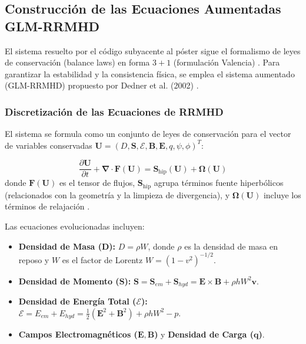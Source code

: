 \subsection{Construcción de las Ecuaciones Aumentadas GLM-RRMHD}

El sistema resuelto por el código subyacente al póster sigue el formalismo de leyes de conservación (balance laws) en forma $3+1$ (formulación Valencia) \cite{180, 182, 365, 417}. Para garantizar la estabilidad y la consistencia física, se emplea el sistema aumentado (GLM-RRMHD) propuesto por Dedner et al. (2002) \cite{356, 367, 420, 426, 431, 461, 462, 497}.

\subsubsection{Discretización de las Ecuaciones de RRMHD}

El sistema se formula como un conjunto de leyes de conservación para el vector de variables conservadas $\mathbf{U} = (D, \mathbf{S}, \mathcal{E}, \mathbf{B}, \mathbf{E}, q, \psi, \phi)^T$:

\begin{equation}
\label{eq:RRMHD_conservative}
\frac{\partial \mathbf{U}}{\partial t} + \mathbf{\nabla} \cdot \mathbf{F}(\mathbf{U}) = \mathbf{S}_{\text{hip}}(\mathbf{U}) + \mathbf{\Omega}(\mathbf{U})
\end{equation}
donde $\mathbf{F}(\mathbf{U})$ es el tensor de flujos, $\mathbf{S}_{\text{hip}}$ agrupa términos fuente hiperbólicos (relacionados con la geometría y la limpieza de divergencia), y $\mathbf{\Omega}(\mathbf{U})$ incluye los términos de relajación \cite{365, 463}.

Las ecuaciones evolucionadas incluyen:
\begin{itemize}
    \item \textbf{Densidad de Masa ($\mathbf{D}$):} $D = \rho W$, donde $\rho$ es la densidad de masa en reposo y $W$ es el factor de Lorentz $W = (1 - v^2)^{-1/2}$.
    \item \textbf{Densidad de Momento ($\mathbf{S}$):} $\mathbf{S} = \mathbf{S}_{em} + \mathbf{S}_{hyd} = \mathbf{E} \times \mathbf{B} + \rho h W^2 \mathbf{v}$.
    \item \textbf{Densidad de Energía Total ($\mathbf{\mathcal{E}}$):} $\mathcal{E} = E_{em} + E_{hyd} = \frac{1}{2} (\mathbf{E}^2 + \mathbf{B}^2) + \rho h W^2 - p$.
    \item \textbf{Campos Electromagnéticos ($\mathbf{E}, \mathbf{B}$)} y \textbf{Densidad de Carga ($\mathbf{q}$)}.
\end{itemize}


